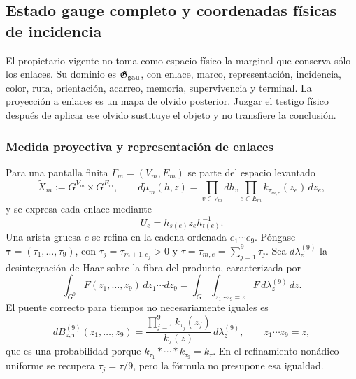 \subsection{Estado gauge completo y coordenadas físicas de incidencia}

El propietario vigente no toma como espacio físico la marginal que conserva sólo
los enlaces. Su dominio es $\mathfrak G_{\rm gau}$, con enlace, marco,
representación, incidencia, color, ruta, orientación,
acarreo, memoria, supervivencia y terminal. La proyección a enlaces es un mapa de
olvido posterior. Juzgar el testigo físico después de aplicar ese olvido sustituye el
objeto y no transfiere la conclusión.

\subsubsection{Medida proyectiva y representación de enlaces}

Para una pantalla finita $\Gamma_m=(V_m,E_m)$ se parte del espacio levantado
\begin{equation}\label{eq:pdf2-ym-owner-lifted-space}
 \widetilde X_m:=G^{V_m}\times G^{E_m},\qquad
 d\widetilde\mu_m(h,z)
 =\prod_{v\in V_m}dh_v\prod_{e\in E_m}k_{\tau_{m,e}}(z_e)\,dz_e,
\end{equation}
y se expresa cada enlace mediante
\begin{equation}\label{eq:pdf2-ym-owner-link-publication}
 U_e=h_{s(e)}z_eh_{t(e)}^{-1}.
\end{equation}
Una arista gruesa $e$ se refina en la cadena ordenada
$e_1\cdots e_9$. Póngase
\(\boldsymbol\tau=(\tau_1,\ldots,\tau_9)\), con
\(\tau_j=\tau_{m+1,e_j}>0\) y
\(\tau=\tau_{m,e}=\sum_{j=1}^9\tau_j\). Sea
\(d\lambda_z^{(9)}\) la desintegración de Haar sobre la fibra del producto,
caracterizada por
\[
 \int_{G^9}F(z_1,\ldots,z_9)\,dz_1\cdots dz_9
 =\int_G\int_{z_1\cdots z_9=z}
   F\,d\lambda_z^{(9)}\,dz.
\]
El puente correcto para tiempos no necesariamente iguales es
\begin{equation}\label{eq:pdf2-ym-owner-heat-bridge}
 dB_{z,\boldsymbol\tau}^{(9)}(z_1,\ldots,z_9)
 =\frac{\prod_{j=1}^9k_{\tau_j}(z_j)}{k_\tau(z)}
   \,d\lambda_z^{(9)},
 \qquad z_1\cdots z_9=z,
\end{equation}
que es una probabilidad porque
\(k_{\tau_1}*\cdots*k_{\tau_9}=k_\tau\). En el refinamiento nonádico uniforme se
recupera \(\tau_j=\tau/9\), pero la fórmula no presupone esa igualdad.

